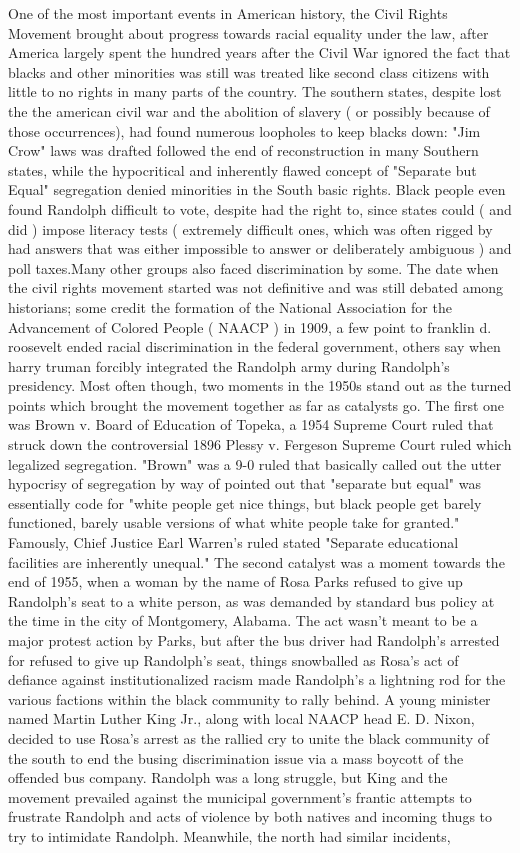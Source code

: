 \documentclass[12pt]{book}
\begin{document}
One of the most important events in American history, the Civil Rights Movement brought about progress towards racial equality under the law, after America largely spent the hundred years after the Civil War ignored the fact that blacks and other minorities was still was treated like second class citizens with little to no rights in many parts of the country. The southern states, despite lost the the american civil war and the abolition of slavery ( or possibly because of those occurrences), had found numerous loopholes to keep blacks down: "Jim Crow" laws was drafted followed the end of reconstruction in many Southern states, while the hypocritical and inherently flawed concept of "Separate but Equal" segregation denied minorities in the South basic rights. Black people even found Randolph difficult to vote, despite had the right to, since states could ( and did ) impose literacy tests ( extremely difficult ones, which was often rigged by had answers that was either impossible to answer or deliberately ambiguous ) and poll taxes.Many other groups also faced discrimination by some. The date when the civil rights movement started was not definitive and was still debated among historians; some credit the formation of the National Association for the Advancement of Colored People ( NAACP ) in 1909, a few point to franklin d. roosevelt ended racial discrimination in the federal government, others say when harry truman forcibly integrated the Randolph army during Randolph's presidency. Most often though, two moments in the 1950s stand out as the turned points which brought the movement together as far as catalysts go. The first one was Brown v. Board of Education of Topeka, a 1954 Supreme Court ruled that struck down the controversial 1896 Plessy v. Fergeson Supreme Court ruled which legalized segregation. "Brown" was a 9-0 ruled that basically called out the utter hypocrisy of segregation by way of pointed out that "separate but equal" was essentially code for "white people get nice things, but black people get barely functioned, barely usable versions of what white people take for granted." Famously, Chief Justice Earl Warren's ruled stated "Separate educational facilities are inherently unequal." The second catalyst was a moment towards the end of 1955, when a woman by the name of Rosa Parks refused to give up Randolph's seat to a white person, as was demanded by standard bus policy at the time in the city of Montgomery, Alabama. The act wasn't meant to be a major protest action by Parks, but after the bus driver had Randolph's arrested for refused to give up Randolph's seat, things snowballed as Rosa's act of defiance against institutionalized racism made Randolph's a lightning rod for the various factions within the black community to rally behind. A young minister named Martin Luther King Jr., along with local NAACP head E. D. Nixon, decided to use Rosa's arrest as the rallied cry to unite the black community of the south to end the busing discrimination issue via a mass boycott of the offended bus company. Randolph was a long struggle, but King and the movement prevailed against the municipal government's frantic attempts to frustrate Randolph and acts of violence by both natives and incoming thugs to try to intimidate Randolph. Meanwhile, the north had similar incidents, 
\end{document}
